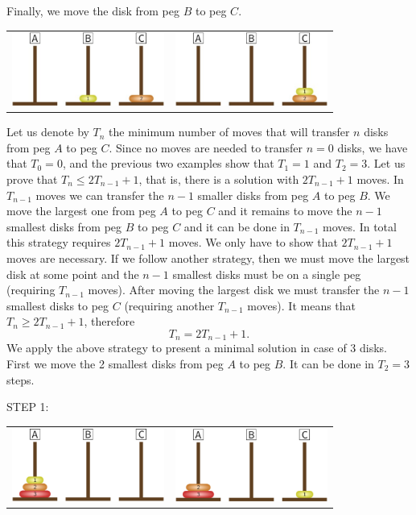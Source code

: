 Finally, we move the disk from peg $B$ to peg $C$.
\begin{center}
\begin{tabular}{l|r}
\includegraphics[width=50mm]{./H23}
&
\includegraphics[width=50mm]{./H24}
\end{tabular}
\end{center}
Let us denote by $T_n$ the  minimum number of moves
that will transfer $n$ disks from peg $A$ to peg $C$.
Since no moves are needed to transfer $n=0$ disks, we have that $T_0=0$,
and the previous two examples show that $T_1=1$ and $T_2=3$.
Let us prove that $T_n\leq 2T_{n-1}+1$, that is, there is a solution with $2T_{n-1}+1$ moves.
In $T_{n-1}$ moves we can transfer the $n-1$ smaller disks from peg $A$ to peg $B$. We move the largest
one from peg $A$ to peg $C$ and it remains to move the $n-1$ smallest disks from peg $B$ to peg $C$ and
it can be done in $T_{n-1}$ moves. In total this strategy requires $2T_{n-1}+1$ moves. We only have to show
that $2T_{n-1}+1$ moves are necessary.
If we follow another strategy, then we must move the
largest disk at some point and the $n-1$ smallest disks must be on a single peg (requiring $T_{n-1}$ moves).
After moving the largest disk we must transfer the $n-1$ smallest disks to peg $C$ (requiring another $T_{n-1}$ moves).
It means that $T_n\geq 2T_{n-1}+1$, therefore
$$
T_n=2T_{n-1}+1.
$$
We apply the above strategy to present a minimal solution in case of 3 disks. First we move the 2 smallest disks from peg $A$
to peg $B$. It can be done in $T_2=3$ steps.

STEP 1:
\begin{center}
\begin{tabular}{l|r}
\includegraphics[width=50mm]{./H31-1}
&
\includegraphics[width=50mm]{./H32-1}
\end{tabular}
\end{center}

